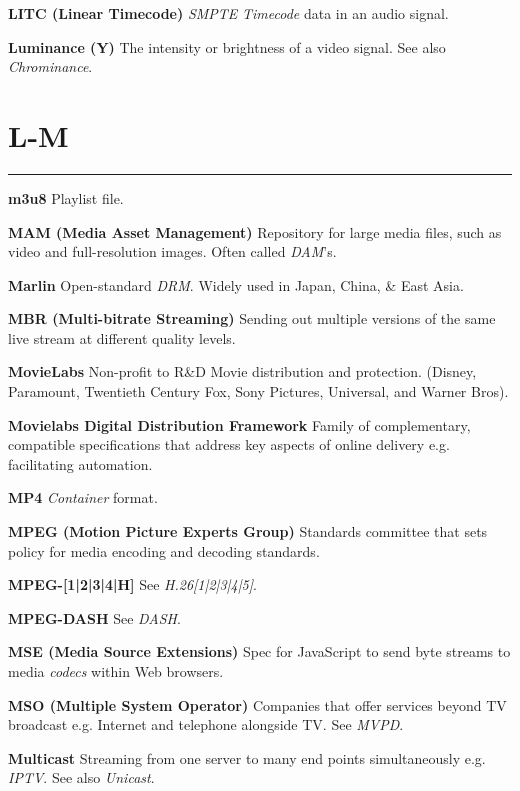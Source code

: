 \smallskip
\textbf{LITC (Linear Timecode)}
\textit{SMPTE} \textit{Timecode} data in an audio signal.

\smallskip
\textbf{Luminance (Y)}
The intensity or brightness of a video signal. See also \textit{Chrominance}.

\section{L-M}
\hrule

\medskip


\smallskip
\textbf{m3u8}
Playlist file.

\smallskip
\textbf{MAM (Media Asset Management)}
Repository for large media files, such as video and full-resolution images. Often called \textit{DAM}'s.

\smallskip
\textbf{Marlin}
Open-standard \textit{DRM}. Widely used in Japan, China, \& East Asia.

\smallskip
\textbf{MBR (Multi-bitrate Streaming)}
Sending out multiple versions of the same live stream at different quality levels.

\smallskip
\textbf{MovieLabs}
Non-profit to R\&D Movie distribution and protection. (Disney, Paramount, Twentieth Century Fox, Sony Pictures, Universal, and Warner Bros).

\smallskip
\textbf{Movielabs Digital Distribution Framework}
Family of complementary, compatible specifications that address key aspects of online delivery e.g. facilitating automation.

\smallskip
\textbf{MP4}
\textit{Container} format.

\smallskip
\textbf{MPEG (Motion Picture Experts Group)}
Standards committee that sets policy for media encoding and decoding standards.

\smallskip
\textbf{MPEG-[1|2|3|4|H]}
See \textit{H.26[1|2|3|4|5]}.

\smallskip
\textbf{MPEG-DASH}
See \textit{DASH}.

\smallskip
\textbf{MSE (Media Source Extensions)}
Spec for JavaScript to send byte streams to media \textit{codecs} within Web browsers.

\smallskip
\textbf{MSO (Multiple System Operator)}
Companies that offer services beyond TV broadcast e.g. Internet and telephone alongside TV.  See \textit{MVPD}.

\smallskip
\textbf{Multicast}
Streaming from one server to many end points simultaneously e.g. \textit{IPTV}.  See also \textit{Unicast}.


